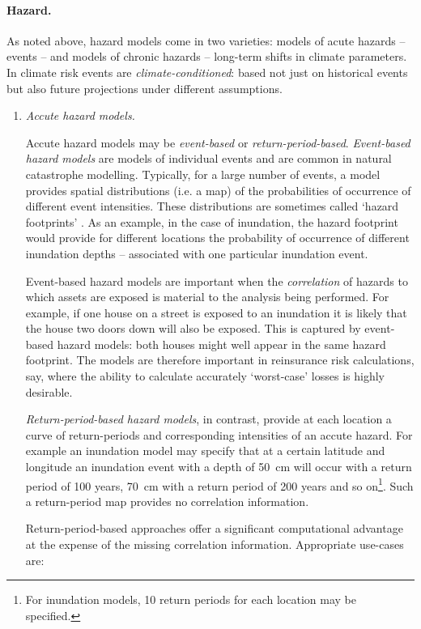 \documentclass[a4paper,11pt]{extarticle} %
\theoremstyle{definition}
\begin{document}
\paragraph{Hazard.}
As noted above, hazard models come in two varieties: models of acute hazards -- events -- and models of chronic hazards -- long-term shifts in climate parameters. In climate risk events are \emph{climate-conditioned}: based not just on historical events but also future projections under different assumptions.
\begin{enumerate}[label=\Alph*.]
\item{\emph{Accute hazard models.}}

Accute hazard models may be \emph{event-based} or \emph{return-period-based}.
\emph{Event-based hazard models} are models of individual events and are common in natural catastrophe modelling. Typically, for a large number of events, a model provides spatial distributions (i.e. a map) of the probabilities of occurrence of different event intensities. These distributions are sometimes called `hazard footprints' \cite{OasisFinancialModule}. As an example, in the case of inundation, the hazard footprint would provide for different locations the probability of occurrence of different inundation depths -- associated with one particular inundation event.

Event-based hazard models are important when the \emph{correlation} of hazards to which assets are exposed is material to the analysis being performed. For example, if one house on a street is exposed to an inundation it is likely that the house two doors down will also be exposed. This is captured by event-based hazard models: both houses might well appear in the same hazard footprint. The models are therefore important in reinsurance risk calculations, say, where the ability to calculate accurately `worst-case' losses is highly desirable.

\emph{Return-period-based hazard models}, in contrast, provide at each location a curve of return-periods and corresponding intensities of an accute hazard. For example an inundation model may specify that at a certain latitude and longitude an inundation event with a depth of 50~cm will occur with a return period of 100 years, 70~cm with a return period of 200 years and so on\footnote{For inundation models, 10 return periods for each location may be specified.}. Such a return-period map provides no correlation information.

Return-period-based approaches offer a significant computational advantage at the expense of the missing correlation information. Appropriate use-cases are:


\end{enumerate}
\end{document}
